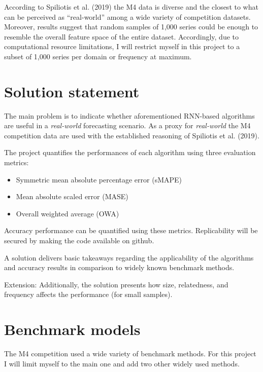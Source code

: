 \documentclass[11pt]{article}
\providecommand{\tightlist}{%
      \setlength{\itemsep}{0pt}\setlength{\parskip}{0pt}}
\begin{document}
According to Spiliotis et al. (2019) the M4 data is diverse and the
closest to what can be perceived as ``real-world'' among a wide variety
of competition datasets. Moreover, results suggest that random samples
of 1,000 series could be enough to resemble the overall feature space of
the entire dataset. Accordingly, due to computational resource
limitations, I will restrict myself in this project to a subset of 1,000
series per domain or frequency at maximum.

    \hypertarget{solution-statement}{%
\section{Solution statement}\label{solution-statement}}

The main problem is to indicate whether aforementioned RNN-based
algorithms are useful in a \emph{real-world} forecasting scenario. As a
proxy for \emph{real-world} the M4 competition data are used with the
established reasoning of Spiliotis et al. (2019).

The project quantifies the performances of each algorithm using three
evaluation metrics:

\begin{itemize}
\tightlist
\item
  Symmetric mean absolute percentage error (sMAPE)
\item
  Mean absolute scaled error (MASE)
\item
  Overall weighted average (OWA)
\end{itemize}

Accuracy performance can be quantified using these metrics.
Replicability will be secured by making the code available on github.

A solution delivers basic takeaways regarding the applicability of the
algorithms and accuracy results in comparison to widely known benchmark
methods.

Extension: Additionally, the solution presents how size, relatedness,
and frequency affects the performance (for small samples).

    \hypertarget{benchmark-models}{%
\section{Benchmark models}\label{benchmark-models}}

The M4 competition used a wide variety of benchmark methods. For this
project I will limit myself to the main one and add two other widely
used methods.
\end{document}
